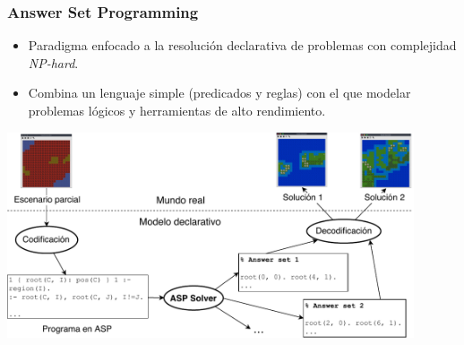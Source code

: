 \begin{frame}
	\frametitle{Answer Set Programming}

	\begin{itemize}
		\item<1-> Paradigma enfocado a la \textcolor{UDCpink}{resolución declarativa} de problemas con complejidad \textcolor{UDCpink}{\textit{NP-hard}}.
		
		\vspace{0.5em}
		
		\item<2-> Combina un \textcolor{UDCpink}{lenguaje simple} (predicados y reglas) con el que modelar problemas lógicos y \textcolor{UDCpink}{herramientas de alto rendimiento}.
	\end{itemize}

	\vspace{0.5em}
	
	\pause[3]
	
	\centering
	\includegraphics[width=0.9\textwidth]{images/funcionamiento-asp.pdf}
	
\end{frame}

